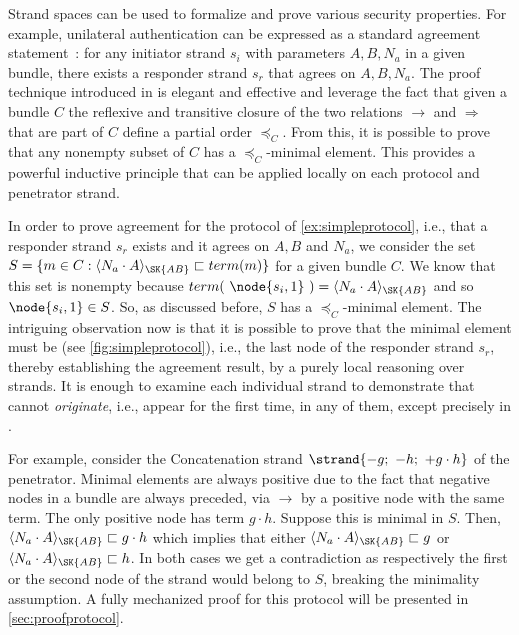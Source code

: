 Strand spaces can be used to formalize and prove various security properties. For example, unilateral authentication can be expressed as a standard
agreement statement~\cite{lowe1997hierarchy}: for any initiator strand $s_i$ with parameters $A, B, N_a$ in a given bundle, there exists a responder strand $s_r$ that agrees on $A, B, N_a$.
The proof technique introduced in \cite{FHG98} is elegant and effective and leverage the fact that given a bundle $C$ the reflexive and transitive closure of the two relations $\rightarrow$ and $\Rightarrow$ that are part of $C$ define a partial order $\preceq_C$. From this, it is possible to prove that any nonempty subset of $C$ has a $\preceq_C$-minimal element. This provides a powerful inductive principle that can be applied locally on each protocol and penetrator strand.

\begin{example}
  \label{ex:proofs}
  In order to prove agreement for the protocol of \cref{ex:simpleprotocol}, i.e., that a responder strand $s_r$ exists and it agrees on $A, B$ and $N_a$, we consider the set $S = \{ m \in  C : \enc{N_a \cdot A}{ \SK{AB}} \sqsubset term(m) \}$ for a given bundle $C$. We know that this set is nonempty because $term(~\node{s_i,1}~) = \enc{N_a \cdot A}{ \SK{AB}}$ and so $\node{s_i,1} \in S$. So, as discussed before, $S$ has a $\preceq_C$-minimal element.
  The intriguing observation now is that it is possible to prove that the minimal element must be  (see \cref{fig:simpleprotocol}), i.e., the last node of the responder strand $s_r$, thereby establishing the agreement result, by a purely local reasoning over strands.
  It is enough to examine each individual strand to demonstrate that   cannot \emph{originate}, i.e., appear for the first time, in any of them, except precisely in .

  For example, consider the {Concatenation} strand
  $ \strand{-g;~ {-h};~ {+g \cdot h}} $ of the penetrator. Minimal elements are always positive due to the fact that negative nodes in a bundle are always preceded, via $\rightarrow$ by a positive node with the same term.
  The only positive node has term ${g \cdot h}$. Suppose this is minimal in $S$. Then, $\enc{N_a \cdot A}{ \SK{AB}} \sqsubset {g \cdot h}$ which implies that either $\enc{N_a \cdot A}{ \SK{AB}} \sqsubset g$ or $\enc{N_a \cdot A}{ \SK{AB}} \sqsubset h$. In both cases we get a contradiction as respectively the first or the second node of the strand would belong to $S$, breaking the minimality assumption. A fully mechanized proof for this protocol will be presented in \cref{sec:proofprotocol}.
\end{example}

